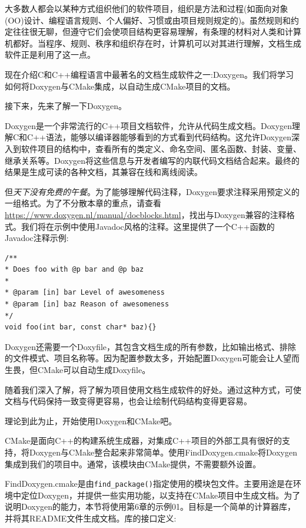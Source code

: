 
大多数人都会以某种方式组织他们的软件项目，组织是方法和过程(如面向对象(OO)设计、编程语言规则、个人偏好、习惯或由项目规则规定的)。虽然规则和约定往往很无聊，但遵守它们会使项目结构更容易理解，有条理的材料对人类和计算机都好。当程序、规则、秩序和组织存在时，计算机可以对其进行理解，文档生成软件正是利用了这一点。

现在介绍C和C++编程语言中最著名的文档生成软件之一:Doxygen。我们将学习如何将Doxygen与CMake集成，以自动生成CMake项目的文档。

接下来，先来了解一下Doxygen。


Doxygen是一个非常流行的C++项目文档软件，允许从代码生成文档。Doxygen理解C和C++语法，能够以编译器能够看到的方式看到代码结构。这允许Doxygen深入到软件项目的结构中，查看所有的类定义、命名空间、匿名函数、封装、变量、继承关系等。Doxygen将这些信息与开发者编写的内联代码文档结合起来。最终的结果是生成可读的各种文档，其兼容在线和离线阅读。

但\textit{天下没有免费的午餐}。为了能够理解代码注释，Doxygen要求注释采用预定义的一组格式。为了不分散本章的重点，请查看\url{https://www.doxygen.nl/manual/docblocks.html}，找出与Doxygen兼容的注释格式。我们将在示例中使用Javadoc风格的注释。这里提供了一个C++函数的Javadoc注释示例:

\begin{lstlisting}[style=styleCXX]
/**
* Does foo with @p bar and @p baz
*
* @param [in] bar Level of awesomeness
* @param [in] baz Reason of awesomeness
*/
void foo(int bar, const char* baz){}
\end{lstlisting}

Doxygen还需要一个Doxyfile，其包含文档生成的所有参数，比如输出格式、排除的文件模式、项目名称等。因为配置参数太多，开始配置Doxygen可能会让人望而生畏，但CMake可以自动生成Doxyfile。

随着我们深入了解，将了解为项目使用文档生成软件的好处。通过这种方式，可使文档与代码保持一致变得更容易，也会让绘制代码结构变得更容易。

理论到此为止，开始使用Doxygen和CMake吧。


CMake是面向C++的构建系统生成器，对集成C++项目的外部工具有很好的支持，将Doxygen与CMake整合起来非常简单。使用FindDoxygen.cmake将Doxygen集成到我们的项目中。通常，该模块由CMake提供，不需要额外设置。

FindDoxygen.cmake是由\texttt{find\_package()}指定使用的模块包文件。主要用途是在环境中定位Doxygen，并提供一些实用功能，以支持在CMake项目中生成文档。为了说明Doxygen的能力，本节将使用第6章的示例01。目标是一个简单的计算器库，并将其README文件生成文档。库的接口定义:

